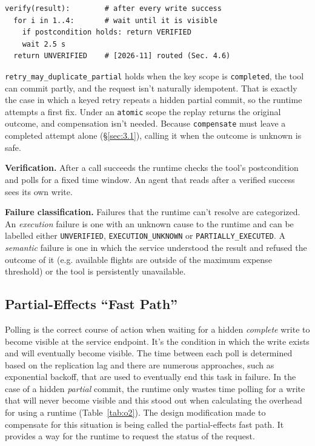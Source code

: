 \documentclass[letterpaper,twocolumn,10pt]{article}
\begin{document}
\begin{Verbatim}[breaklines,samepage=true,fontsize=\footnotesize]
verify(result):        # after every write success
  for i in 1..4:       # wait until it is visible
    if postcondition holds: return VERIFIED
    wait 2.5 s
  return UNVERIFIED    # [2026-11] routed (Sec. 4.6)
\end{Verbatim}

\texttt{retry\_may\_duplicate\_partial} holds when the key scope is \texttt{completed}, the tool can commit partly, and the request isn't naturally idempotent. That is exactly the case in which a keyed retry repeats a hidden partial commit, so the runtime attempts a first fix. Under an \texttt{atomic} scope the replay returns the original outcome, and compensation isn't needed. Because \texttt{compensate} must leave a completed attempt alone (\S\ref{sec:3.1}), calling it when the outcome is unknown is safe.

\textbf{Verification.} After a call succeeds the runtime checks the tool's postcondition and polls for a fixed time window. An agent that reads after a verified success sees its own write.

\textbf{Failure classification.} Failures that the runtime can't resolve are categorized. An \emph{execution} failure is one with an unknown cause to the runtime and can be labelled either \texttt{UNVERIFIED}, \texttt{EXECUTION\_UNKNOWN} or \texttt{PARTIALLY\_EXECUTED}. A \emph{semantic} failure is one in which the service understood the result and refused the outcome of it (e.g. available flights are outside of the maximum expense threshold) or the tool is persistently unavailable.

\subsection{Partial-Effects ``Fast Path''}\label{sec:4.3}

Polling is the correct course of action when waiting for a hidden \emph{complete} write to become visible at the service endpoint. It's the condition in which the write exists and will eventually become visible. The time between each poll is determined based on the replication lag and there are numerous approaches, such as exponential backoff, that are used to eventually end this task in failure. In the case of a hidden \emph{partial} commit, the runtime only wastes time polling for a write that will never become visible and this stood out when calculating the overhead for using a runtime (Table~\ref{tab:o2}). The design modification made to compensate for this situation is being called the partial-effects fast path. It provides a way for the runtime to request the status of the request.
\end{document}
